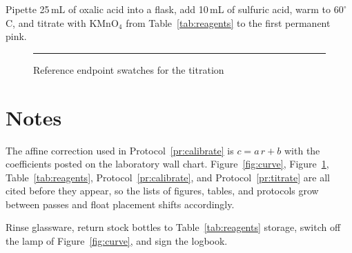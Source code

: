 \documentclass[11pt]{article}
\begin{document}
\begin{protocol}[H]
  \caption{Standardizing the permanganate}
  \label{pr:titrate}
  Pipette 25\,mL of oxalic acid into a flask, add 10\,mL of sulfuric acid,
  warm to $60^{\circ}$C, and titrate with KMnO$_4$ from
  Table~\ref{tab:reagents} to the first permanent pink.
\end{protocol}

\begin{figure}[H]
  \centering
  \rule{0.6\textwidth}{2.5cm}
  \caption{Reference endpoint swatches for the titration}
  \label{fig:swatch}
\end{figure}

\section{Notes}
\label{sec:notes}

The affine correction used in Protocol~\ref{pr:calibrate} is
$c = a\,r + b$ with the coefficients posted on the laboratory wall chart.
Figure~\ref{fig:curve}, Figure~\ref{fig:swatch}, Table~\ref{tab:reagents},
Protocol~\ref{pr:calibrate}, and Protocol~\ref{pr:titrate} are all cited
before they appear, so the lists of figures, tables, and protocols grow
between passes and float placement shifts accordingly.

\begin{protocol}[H]
  \caption{Shutting down the bench}
  \label{pr:shutdown}
  Rinse glassware, return stock bottles to Table~\ref{tab:reagents} storage,
  switch off the lamp of Figure~\ref{fig:curve}, and sign the logbook.
\end{protocol}
\end{document}
